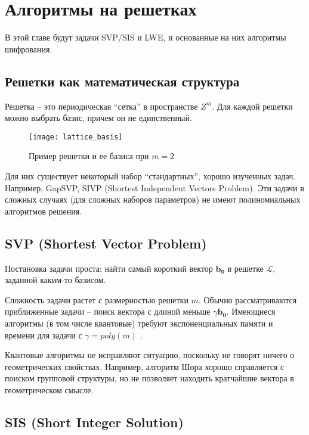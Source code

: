 \chapter{Алгоритмы на решетках}
\label{ch:chap2}

В этой главе будут задачи SVP/SIS и LWE, и основанные на них алгоритмы шифрования.

\section{Решетки как математическая структура}
\label{sec:lattice_math}

Решетка -- это периодическая ``сетка'' в пространстве $Z^m$.
Для каждой решетки можно выбрать базис, причем он не единственный.

\begin{figure}[ht]
	\centering
	\texttt{[image: lattice\_basis]}
	\caption{Пример решетки и ее базиса при $m = 2$}
	\label{fig:lattice_basis}
\end{figure}

Для них существует некоторый набор ``стандартных'', хорошо изученных задач. Например, GapSVP, SIVP (Shortest Independent Vectors Problem). Эти задачи в сложных случаях (для сложных наборов параметров) не имеют полиномиальных алгоритмов решения.

\section{SVP (Shortest Vector Problem)}

Постановка задачи проста: найти самый короткий вектор $\bm{b_0}$ в решетке $\mathcal{L}$, заданной каким-то базисом.

Сложность задачи растет с размерностью решетки $m$. Обычно рассматриваются приближенные задачи -- поиск вектора с длиной меньше $\gamma \boldsymbol{b_0}$. Имеющиеся алгоритмы (в том числе квантовые) требуют экспоненциальных памяти и времени для задачи с $\gamma = poly(m)$ \cite{svp}.

Квантовые алгоритмы не исправляют ситуацию, поскольку не говорят ничего о геометрических свойствах. Например, алгоритм Шора хорошо справляется с поиском групповой структуры, но не позволяет находить кратчайшие вектора в геометрическом смысле.

\section{SIS (Short Integer Solution)}


